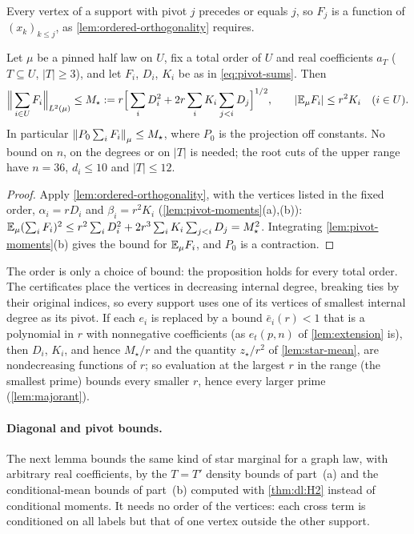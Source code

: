 Every vertex of a support with pivot $j$ precedes or equals $j$, so $F_j$ is a
function of $(x_k)_{k\le j}$, as \cref{lem:ordered-orthogonality} requires.

\begin{proposition}\label{prop:advance:ordered-star}
Let $\mu$ be a pinned half law on $U$, fix a total order of $U$ and real
coefficients $a_T$ ($T\subseteq U$, $|T|\ge3$), and let $F_i$, $D_i$, $K_i$ be as
in \eqref{eq:pivot-sums}. Then
\[
  \Big\|\sum_{i\in U}F_i\Big\|_{L^2(\mu)}\le M_\star
  :=r\Big[\sum_iD_i^2+2r\sum_iK_i\sum_{j<i}D_j\Big]^{1/2},
  \qquad |\mathbb E_\mu F_i|\le r^2K_i\quad(i\in U).
\]
In particular $\left\|P_0\sum_iF_i\right\|_\mu\le M_\star$, where $P_0$ is the projection
off constants. No bound on $n$, on the degrees or on $|T|$ is needed; the root
cuts of the upper range have $n=36$, $d_i\le10$ and $|T|\le12$.
\end{proposition}

\begin{proof}
Apply \cref{lem:ordered-orthogonality}, with the vertices listed in the fixed
order, $\alpha_i=rD_i$ and $\beta_i=r^2K_i$ (\cref{lem:pivot-moments}(a),(b)):
$\mathbb E_\mu(\sum_iF_i)^2\le r^2\sum_iD_i^2+2r^3\sum_iK_i\sum_{j<i}D_j=M_\star^2$.
Integrating \cref{lem:pivot-moments}(b) gives the bound for $\mathbb E_\mu F_i$, and
$P_0$ is a contraction.
\end{proof}

\begin{remark}\label{rem:pivot-order}
The order is only a choice of bound: the proposition holds for every total
order. The certificates place the vertices in decreasing internal degree,
breaking ties by their original indices, so every support uses one of its
vertices of smallest internal degree as its pivot. If each $e_i$ is replaced by
a bound $\bar e_i(r)<1$ that is a polynomial in $r$ with nonnegative
coefficients (as $e_t(p,n)$ of \cref{lem:extension} is), then $D_i$, $K_i$, and
hence $M_\star/r$ and the quantity $z_\star/r^2$ of \cref{lem:star-mean}, are
nondecreasing functions of $r$; so evaluation at the largest $r$ in the range (the smallest prime) bounds every smaller $r$, hence every larger prime (\cref{lem:majorant}).
\end{remark}

\paragraph{Diagonal and pivot bounds.}
The next lemma bounds the same kind of star marginal for a graph law, with
arbitrary real coefficients, by the $T=T'$ density bounds of part~\textup{(a)} and the conditional-mean bounds of part~\textup{(b)}
computed with \cref{thm:dl:H2} instead of conditional moments. It needs no
order of the vertices: each cross term is conditioned on all labels but that
of one vertex outside the other support.

